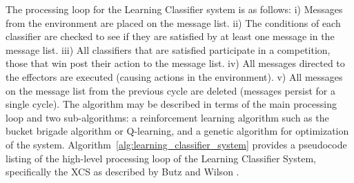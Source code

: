 The processing loop for the Learning Classifier system is as follows: i) Messages from the environment are placed on the message list. ii) The conditions of each classifier are checked to see if they are satisfied by at least one message in the message list. iii) All classifiers that are satisfied participate in a competition, those that win post their action to the message list. iv) All messages directed to the effectors are executed (causing actions in the environment). v) All messages on the message list from the previous cycle are deleted (messages persist for a single cycle).
The algorithm may be described in terms of the main processing loop and two sub-algorithms: a reinforcement learning algorithm such as the bucket brigade algorithm or Q-learning, and a genetic algorithm for optimization of the system.
Algorithm~\ref{alg:learning_classifier_system} provides a pseudocode listing of the high-level processing loop of the Learning Classifier System, specifically the XCS as described by Butz and Wilson \cite{Butz2002a}. 

